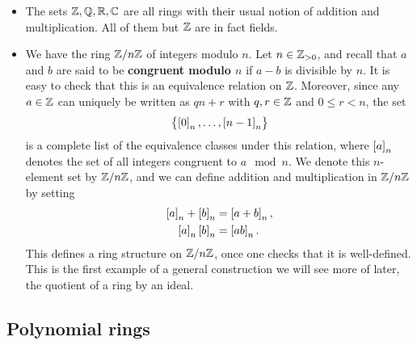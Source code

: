\begin{example*}
\hfill
\begin{itemize}
\item The sets $ \mathbb{Z}, \mathbb{Q}, \mathbb{R}, \mathbb{C} $ are all rings with their usual notion of addition and multiplication. All of them but $ \mathbb{Z} $ are in fact fields.
\item We have the ring $ \mathbb{Z} / n\mathbb{Z} $ of integers modulo $ n $. Let $ n \in \mathbb{Z}_{> 0} $, and recall that $ a $ and $ b $ are said to be \textbf{congruent modulo $ n $} if $ a - b $ is divisible by $ n $. It is easy to check that this is an equivalence relation on $ \mathbb{Z} $. Moreover, since any $ a \in \mathbb{Z} $ can uniquely be written as $ qn + r $ with $ q, r \in \mathbb{Z} $ and $ 0 \le r < n $, the set
$$ \cbr{\sbr{0}_n, \dots, \sbr{n - 1}_n} $$
is a complete list of the equivalence classes under this relation, where $ \sbr{a}_n $ denotes the set of all integers congruent to $ a \mod n $. We denote this $ n $-element set by $ \mathbb{Z} / n\mathbb{Z} $, and we can define addition and multiplication in $ \mathbb{Z} / n\mathbb{Z} $ by setting
\begin{align*}
\sbr{a}_n + \sbr{b}_n & = \sbr{a + b}_n, \\
\sbr{a}_n\sbr{b}_n & = \sbr{ab}_n.
\end{align*}
This defines a ring structure on $ \mathbb{Z} / n\mathbb{Z} $, once one checks that it is well-defined. This is the first example of a general construction we will see more of later, the quotient of a ring by an ideal.
\end{itemize}
\end{example*}

\pagebreak

\subsection{Polynomial rings}


